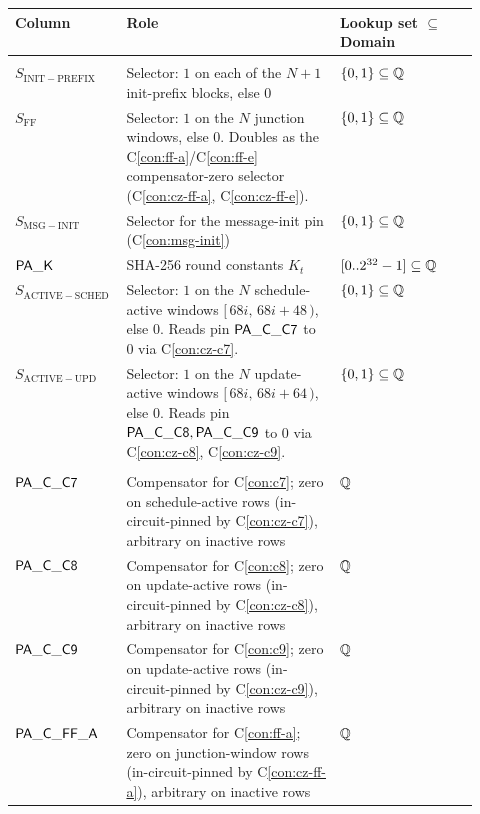 \begin{table}[h]
\centering\small
\begin{tabularx}{\linewidth}{>{\raggedright\arraybackslash}p{0.24\linewidth} >{\raggedright\arraybackslash}X >{\raggedright\arraybackslash}p{0.30\linewidth}}
\toprule
\textbf{Column} & \textbf{Role} & \textbf{Lookup set $\subseteq$ Domain} \\
\midrule
\multicolumn{3}{l}{\textit{Public integer columns ($6$)}} \\[1pt]
$S_{\mathrm{INIT-PREFIX}}$  & Selector: $1$ on each of the $N+1$ init-prefix blocks, else $0$ & $\{0,1\} \subseteq \mathbb{Q}$ \\
$S_{\mathrm{FF}}$           & Selector: $1$ on the $N$ junction windows, else $0$. Doubles as the C\ref{con:ff-a}/C\ref{con:ff-e} compensator-zero selector (C\ref{con:cz-ff-a}, C\ref{con:cz-ff-e}). & $\{0,1\} \subseteq \mathbb{Q}$ \\
$S_{\mathrm{MSG-INIT}}$     & Selector for the message-init pin (C\ref{con:msg-init}) & $\{0,1\} \subseteq \mathbb{Q}$ \\
$\mathsf{PA\_K}$               & SHA-256 round constants $K_t$ & $[0..2^{32}-1] \subseteq \mathbb{Q}$ \\
$S_{\mathrm{ACTIVE-SCHED}}$ & Selector: $1$ on the $N$ schedule-active windows $[\,68i,\,68i+48\,)$, else $0$. Reads pin $\mathsf{PA\_C\_C7}$ to $0$ via C\ref{con:cz-c7}. & $\{0,1\} \subseteq \mathbb{Q}$ \\
$S_{\mathrm{ACTIVE-UPD}}$   & Selector: $1$ on the $N$ update-active windows $[\,68i,\,68i+64\,)$, else $0$. Reads pin $\mathsf{PA\_C\_C8}, \mathsf{PA\_C\_C9}$ to $0$ via C\ref{con:cz-c8}, C\ref{con:cz-c9}. & $\{0,1\} \subseteq \mathbb{Q}$ \\
\midrule
\multicolumn{3}{l}{\textit{Witness integer columns ($5$)}} \\[1pt]
$\mathsf{PA\_C\_C7}$           & Compensator for C\ref{con:c7}; zero on schedule-active rows (in-circuit-pinned by C\ref{con:cz-c7}), arbitrary on inactive rows & $\mathbb{Q}$ \\
$\mathsf{PA\_C\_C8}$           & Compensator for C\ref{con:c8}; zero on update-active rows (in-circuit-pinned by C\ref{con:cz-c8}), arbitrary on inactive rows & $\mathbb{Q}$ \\
$\mathsf{PA\_C\_C9}$           & Compensator for C\ref{con:c9}; zero on update-active rows (in-circuit-pinned by C\ref{con:cz-c9}), arbitrary on inactive rows & $\mathbb{Q}$ \\
$\mathsf{PA\_C\_FF\_A}$        & Compensator for C\ref{con:ff-a}; zero on junction-window rows (in-circuit-pinned by C\ref{con:cz-ff-a}), arbitrary on inactive rows & $\mathbb{Q}$ \\

\end{tabularx}
\end{table}

